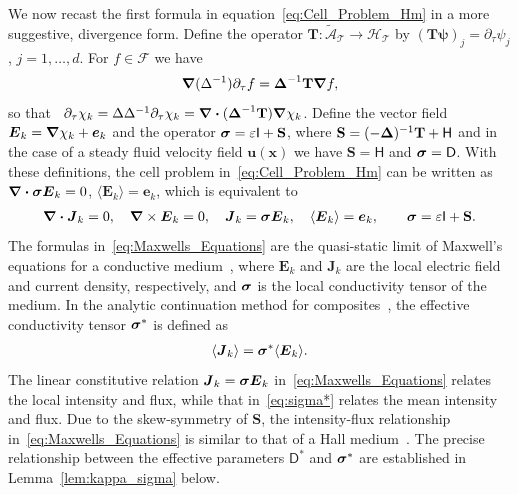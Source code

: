 \documentclass[leqno,onefignum,onetabnum]{siamltex1213}
\newcommand{\lemref}[1]{Lemma~\ref{#1}}
\newcommand{\Tb}{\mathbf{T}}
\newcommand{\Sb}{\mathbf{S}}
\newcommand{\Tc}{\mathcal{T}}
\newcommand{\Hc}{\mathcal{H}}
\newcommand{\Ac}{\mathcal{A}}
\newcommand{\Dm}{\mathsf{D}}
\newcommand{\Hm}{\mathsf{H}}
\newcommand{\Ib}{\mathsf{I}}
\newcommand{\Fs}{\mathscr{F}}
\newcommand\bsig{\mbox{\boldmath${\sigma}$}}
\newcommand\bDelta{\mbox{\boldmath${\Delta}$}}
\newcommand\bnabla{\mbox{\boldmath${\nabla}$}}
\providecommand\bcdot{\boldsymbol{\cdot}}
\newcommand{\vecJ}{\boldsymbol{J}}
\newcommand{\vecE}{\boldsymbol{E}}
\newcommand{\vecx}{\boldsymbol{x}}
\newcommand{\vecu}{\boldsymbol{u}}
\newcommand{\vece}{\boldsymbol{e}}
\newcommand{\vecpsi}{\boldsymbol{\psi}}
\begin{document}
We now recast the first formula in equation~\eqref{eq:Cell_Problem_Hm}
in a more suggestive, divergence form. Define the operator
$\Tb:\tilde{\Ac}_{\Tc}\to\Hc_{\Tc}$ by $(\Tb\vecpsi)_j=\partial_\tau\psi_j$,
$j=1,\ldots,d$. For $f\in\Fs$ we
have~\cite{Fannjiang:1994:SIAM_JAM:333,Novikov:2005:CPAM:867,Folland:99:RealAnalysis,Folland:95:PDEs}     
%
\begin{align}\label{eq:Dt_T}
  \bnabla(\Delta^{-1})\partial_\tau f=\bDelta^{-1}\Tb\bnabla f ,
\end{align}
%
so that~\cite{Fannjiang:1994:SIAM_JAM:333,Novikov:2005:CPAM:867}
$\partial_\tau\chi_k=\Delta\Delta^{-1}\partial_\tau\chi_k=\bnabla \bcdot(\bDelta^{-1}\Tb)\bnabla \chi_k$. Define the  
vector field $\vecE_k=\bnabla \chi_k+\vece_k$ and the operator
$\bsig=\varepsilon\Ib+\Sb$, where
$\Sb=(-\bDelta)^{-1}\Tb+\Hm$ and in the case of a steady fluid velocity
field $\vecu(\vecx)$ we have $\Sb=\Hm$ and $\bsig=\Dm$. With these
definitions, the cell problem in~\eqref{eq:Cell_Problem_Hm} can be
written as $\bnabla\bcdot\bsig\vecE_k=0$, $\langle\vecE_k\rangle=\vece_k$, which
is equivalent to     
%
\begin{align}\label{eq:Maxwells_Equations}    
  \bnabla \bcdot\vecJ_k=0, \quad
  \bnabla \times\vecE_k=0, \quad
  \vecJ_k=\bsig\vecE_k,\quad
  \langle\vecE_k\rangle=\vece _k,\qquad
  \bsig%
       =\varepsilon\Ib+\Sb.
\end{align}
%
The formulas in~\eqref{eq:Maxwells_Equations} are the
quasi-static limit of Maxwell's equations for a conductive
medium~\cite{Golden:CMP-473,MILTON:2002:TC}, where $\vecE_k$ and
$\vecJ_k$ are the local electric field and current density,
respectively, and $\bsig$ is the local conductivity tensor of the
medium. In the analytic continuation method for
composites~\cite{Golden:CMP-473,Milton:APL-300,Bergman:PRC-377}, the
effective conductivity tensor $\bsig^*$ is defined as 
% 
\begin{align}\label{eq:sigma*}
  \langle\vecJ_k\rangle=\bsig^*\langle\vecE_k\rangle.
\end{align}
%
The linear constitutive relation $\vecJ_k=\bsig\vecE_k$
in~\eqref{eq:Maxwells_Equations} relates the local intensity and flux, 
while that in~\eqref{eq:sigma*} relates the mean intensity and
flux. Due to the skew-symmetry of $\Sb$, the intensity-flux
relationship in~\eqref{eq:Maxwells_Equations} is similar to that of a
Hall
medium~\cite{Isichenko:JNS:1991:375,Fannjiang:1994:SIAM_JAM:333,Novikov:2005:CPAM:867}. The
precise relationship between the effective parameters $\Dm^*$ 
and $\bsig^*$ are established in \lemref{lem:kappa_sigma} below.
\end{document}

